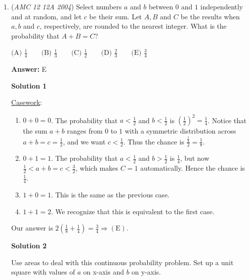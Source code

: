 \begin{enumerate}
 We have $2((-\frac{1}{2})^2+1^2+\frac {1}{r^2}+\frac{1}{r^2})=(-\frac{1}{2}+1+\frac{1}{r}+\frac{1}{r})^2$

 Simplifying, we get $\frac{10}{4}+\frac{4}{r^2}=\frac{1}{4}+\frac{2}{r}+\frac{4}{r^2}$
$\frac{2}{r}=\frac{9}{4}$
$r=\frac{8}{9} \Longrightarrow \qquad \textbf{(D)}$



	\item (\textit{AMC 12 12A 2004}) Select numbers $a$ and $b$ between $0$ and $1$ independently and at random, and let $c$ be their sum. Let $A, B$ and $C$ be the results when $a, b$ and $c$, respectively, are rounded to the nearest integer. What is the probability that $A + B = C$?


 $\text {(A) } \frac14 \qquad \text {(B) } \frac13 \qquad \text {(C) } \frac12 \qquad \text {(D) } \frac23 \qquad \text {(E) }\frac34$

 \textbf{Answer: }E



\textbf{Solution 1}

\href{https://artofproblemsolving.com/wiki/index.php?title=Casework}{Casework}:

 
            \begin{enumerate}
        \item $0 + 0 = 0$. The probability that $a < \frac{1}{2}$ and $b < \frac{1}{2}$ is $\left(\frac 12\right)^2 = \frac{1}{4}$. Notice that the sum $a+b$ ranges from $0$ to $1$ with a symmetric distribution across $a+b=c=\frac 12$, and we want $c < \frac 12$. Thus the chance is $\frac{\frac{1}{4}}2 = \frac 18$.
        \item $0 + 1 = 1$. The probability that $a < \frac 12$ and $b > \frac 12$ is $\frac 14$, but now $\frac{1}{2} < a+b = c < \frac 32$, which makes $C = 1$ automatically. Hence the chance is $\frac 14$.
        \item $1 + 0 = 1$. This is the same as the previous case.
        \item $1 + 1 = 2$. We recognize that this is equivalent to the first case.
            \end{enumerate}
            Our answer is $2\left(\frac 18 + \frac 14 \right) = \frac 34 \Rightarrow \mathrm{(E)}$.

 



\textbf{Solution 2}

Use areas to deal with this continuous probability problem. Set up a unit square with values of $a$ on x-axis and $b$ on y-axis.


\end{enumerate}

